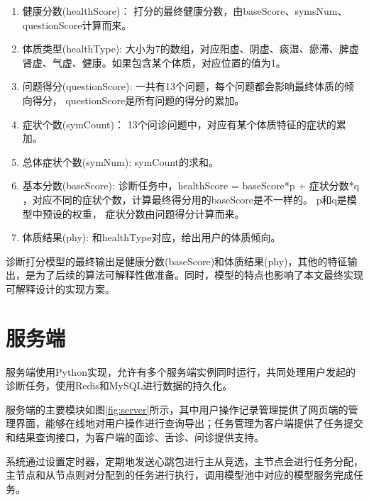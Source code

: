 \begin{enumerate}
    \item 健康分数(healthScore)： 打分的最终健康分数，由baseScore、symsNum、questionScore计算而来。

    \item 体质类型(healthType): 大小为7的数组，对应阳虚、阴虚、痰湿、瘀滞、脾虚肾虚、气虚、健康。如果包含某个体质，对应位置的值为1。

    \item 问题得分(questionScore): 一共有13个问题，每个问题都会影响最终体质的倾向得分， questionScore是所有问题的得分的累加。

    \item 症状个数(symCount)： 13个问诊问题中，对应有某个体质特征的症状的累加。

    \item 总体症状个数(symNum): symCount的求和。

    \item 基本分数(baseScore): 诊断任务中，healthScore = baseScore*p + 症状分数*q ，对应不同的症状个数，计算最终得分用的baseScore是不一样的。 
p和q是模型中预设的权重， 症状分数由问题得分计算而来。

    \item 体质结果(phy): 和healthType对应，给出用户的体质倾向。
\end{enumerate}

诊断打分模型的最终输出是健康分数(baseScore)和体质结果(phy)，其他的特征输出，是为了后续的算法可解释性做准备。同时，模型的特点也影响了本文最终实现可解释设计的实现方案。


\section{服务端}

服务端使用Python实现，允许有多个服务端实例同时运行，共同处理用户发起的诊断任务，使用Redis和MySQL进行数据的持久化。    

服务端的主要模块如图\ref{fig:server}所示，其中用户操作记录管理提供了网页端的管理界面，能够在线地对用户操作进行查询导出；任务管理为客户端提供了任务提交和结果查询接口，为客户端的面诊、舌诊、问诊提供支持。

系统通过设置定时器，定期地发送心跳包进行主从竞选，主节点会进行任务分配，主节点和从节点则对分配到的任务进行执行，调用模型池中对应的模型服务完成任务。



